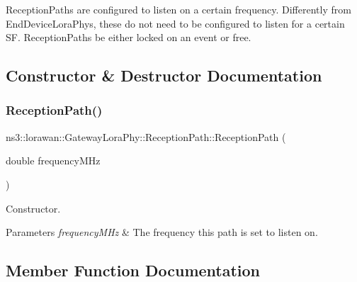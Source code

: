 Reception\+Paths are configured to listen on a certain frequency. Differently from End\+Device\+Lora\+Phys, these do not need to be configured to listen for a certain SF. Reception\+Paths be either locked on an event or free. 

\subsection{Constructor \& Destructor Documentation}
\mbox{\label{classns3_1_1lorawan_1_1GatewayLoraPhy_1_1ReceptionPath_a756ae63851063c8209e6eef149a6088c}} 
\subsubsection{\texorpdfstring{Reception\+Path()}{ReceptionPath()}}
{\footnotesize\ttfamily ns3\+::lorawan\+::\+Gateway\+Lora\+Phy\+::\+Reception\+Path\+::\+Reception\+Path (\begin{DoxyParamCaption}\item[{double}]{frequency\+M\+Hz }\end{DoxyParamCaption})}

Constructor.


\begin{DoxyParams}{Parameters}
{\em frequency\+M\+Hz} & The frequency this path is set to listen on. \\
\hline
\end{DoxyParams}


\subsection{Member Function Documentation}
\mbox{\label{classns3_1_1lorawan_1_1GatewayLoraPhy_1_1ReceptionPath_aa9a5dc2f88ebbef2843cb855c6ec2551}} 
